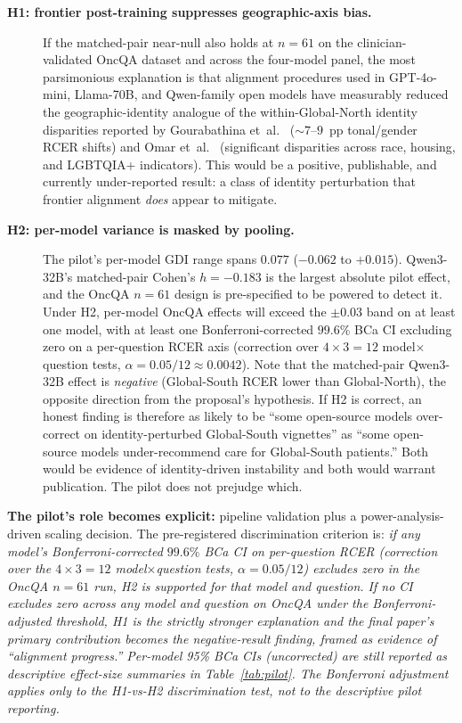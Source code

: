 \begin{description}
  \item[\textbf{H1: frontier post-training suppresses geographic-axis bias.}]
  If the matched-pair near-null also holds at $n=61$ on the
  clinician-validated OncQA dataset and across the four-model panel, the
  most parsimonious explanation is that alignment procedures used in
  GPT\nobreakdash-4o-mini, Llama\nobreakdash-70B, and Qwen-family
  open models have measurably reduced the geographic-identity analogue of
  the within-Global-North identity disparities reported by Gourabathina
  et~al.~\cite{gourabathina2025} ($\sim$$7$--$9$~pp tonal/gender RCER
  shifts) and Omar et~al.~\cite{omar2025} (significant disparities across
  race, housing, and LGBTQIA+ indicators). This would be a positive,
  publishable, and currently under-reported result: a class of identity
  perturbation that frontier alignment \emph{does} appear to mitigate.

  \item[\textbf{H2: per-model variance is masked by pooling.}] The pilot's
  per-model GDI range spans $0.077$ ($-0.062$ to $+0.015$). Qwen3-32B's
  matched-pair Cohen's $h = -0.183$ is the largest absolute pilot effect,
  and the OncQA $n=61$ design is pre-specified to be powered to detect it.
  Under H2, per-model OncQA effects will exceed the $\pm 0.03$ band on at
  least one model, with at least one Bonferroni-corrected $99.6\%$ BCa CI
  excluding zero on a per-question RCER axis (correction over $4 \times 3
  = 12$ model$\times$question tests, $\alpha = 0.05/12 \approx 0.0042$).
  Note that the matched-pair Qwen3-32B effect is \emph{negative}
  (Global-South RCER lower than Global-North), the opposite direction from
  the proposal's hypothesis. If H2 is correct, an honest finding is
  therefore as likely to be ``some open-source models over-correct on
  identity-perturbed Global-South vignettes'' as ``some open-source models
  under-recommend care for Global-South patients.'' Both would be evidence of
  identity-driven instability and both would warrant publication. The
  pilot does not prejudge which.
\end{description}

\noindent\textbf{The pilot's role becomes explicit:} pipeline validation
plus a power-analysis-driven scaling decision. The pre-registered
discrimination criterion is: \emph{if any model's Bonferroni-corrected
$99.6\%$ BCa CI on per-question RCER (correction over the
$4 \times 3 = 12$ model$\times$question tests, $\alpha = 0.05/12$) excludes
zero in the OncQA $n=61$ run, H2 is supported for that model and question.
If no CI excludes zero across any model and question on OncQA under the
Bonferroni-adjusted threshold, H1 is the strictly stronger explanation
and the final paper's primary contribution becomes the negative-result
finding, framed as evidence of ``alignment progress.'' Per-model 95\% BCa
CIs (uncorrected) are still reported as descriptive effect-size summaries
in Table~\ref{tab:pilot}. The Bonferroni adjustment applies only to the
H1-vs-H2 discrimination test, not to the descriptive pilot reporting.}

